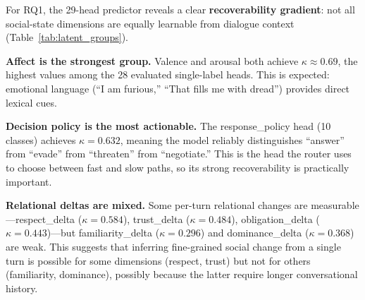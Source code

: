 \documentclass[11pt]{article}
\begin{document}
\begin{table}[t]
\centering
\caption{Per-group latent state prediction metrics (Qwen3-4B, 28 single-label heads evaluated on validation set; dialogue act is multi-label, excluded here). All $\kappa$ values are true Cohen's $\kappa$ computed from confusion matrices.}
\label{tab:latent_groups}
\small
{}
\end{table}

For RQ1, the 29-head predictor reveals a clear \textbf{recoverability gradient}: not all social-state dimensions are equally learnable from dialogue context (Table~\ref{tab:latent_groups}).

\textbf{Affect is the strongest group.} Valence and arousal both achieve $\kappa{\approx}0.69$, the highest values among the 28 evaluated single-label heads.
This is expected: emotional language (``I am furious,'' ``That fills me with dread'') provides direct lexical cues.

\textbf{Decision policy is the most actionable.} The response\_policy head (10 classes) achieves $\kappa{=}0.632$, meaning the model reliably distinguishes ``answer'' from ``evade'' from ``threaten'' from ``negotiate.''
This is the head the router uses to choose between fast and slow paths, so its strong recoverability is practically important.

\textbf{Relational deltas are mixed.} Some per-turn relational changes are measurable---respect\_delta ($\kappa{=}0.584$), trust\_delta ($\kappa{=}0.484$), obligation\_delta ($\kappa{=}0.443$)---but familiarity\_delta ($\kappa{=}0.296$) and dominance\_delta ($\kappa{=}0.368$) are weak.
This suggests that inferring fine-grained social change from a single turn is possible for some dimensions (respect, trust) but not for others (familiarity, dominance), possibly because the latter require longer conversational history.
\end{document}
